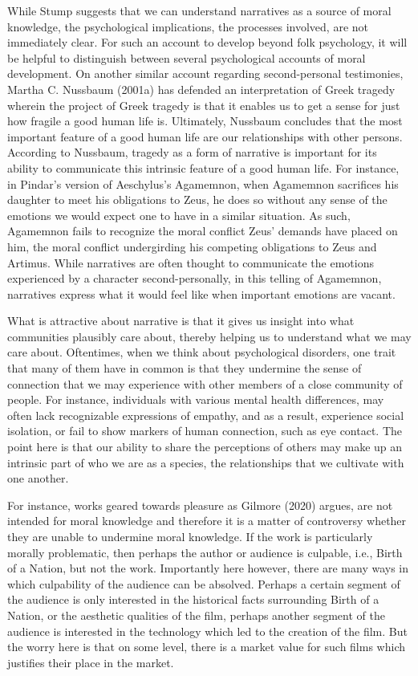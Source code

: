 \documentclass[12pt]{book}
\theoremstyle{definition}
\theoremstyle{remark}
\begin{document}
While Stump suggests that we can understand narratives as a source of moral knowledge, the psychological implications, the processes involved, are not immediately clear. For such an account to develop beyond folk psychology, it will be helpful to distinguish between several psychological accounts of moral development. On another similar account regarding second-personal testimonies, Martha C. Nussbaum (2001a) has defended an interpretation of Greek tragedy wherein the project of Greek tragedy is that it enables us to get a sense for just how fragile a good human life is. Ultimately, Nussbaum concludes that the most important feature of a good human life are our relationships with other persons. According to Nussbaum, tragedy as a form of narrative is important for its ability to communicate this intrinsic feature of a good human life. For instance, in Pindar's version of Aeschylus's Agamemnon, when Agamemnon sacrifices his daughter to meet his obligations to Zeus, he does so without any sense of the emotions we would expect one to have in a similar situation. As such, Agamemnon fails to recognize the moral conflict Zeus' demands have placed on him, the moral conflict undergirding his competing obligations to Zeus and Artimus. While narratives are often thought to communicate the emotions experienced by a character second-personally, in this telling of Agamemnon, narratives express what it would feel like when important emotions are vacant.

What is attractive about narrative is that it gives us insight into what communities plausibly care about, thereby helping us to understand what we may care about. Oftentimes, when we think about psychological disorders, one trait that many of them have in common is that they undermine the sense of connection that we may experience with other members of a close community of people. For instance, individuals with various mental health differences, may often lack recognizable expressions of empathy, and as a result, experience social isolation, or fail to show markers of human connection, such as eye contact. The point here is that our ability to share the perceptions of others may make up an intrinsic part of who we are as a species, the relationships that we cultivate with one another.

For instance, works geared towards pleasure as Gilmore (2020) argues, are not intended for moral knowledge and therefore it is a matter of controversy whether they are unable to undermine moral knowledge. If the work is particularly morally problematic, then perhaps the author or audience is culpable, i.e., Birth of a Nation, but not the work. Importantly here however, there are many ways in which culpability of the audience can be absolved. Perhaps a certain segment of the audience is only interested in the historical facts surrounding Birth of a Nation, or the aesthetic qualities of the film, perhaps another segment of the audience is interested in the technology which led to the creation of the film. But the worry here is that on some level, there is a market value for such films which justifies their place in the market.
\end{document}
